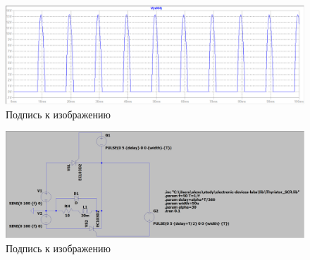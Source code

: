 \documentclass[a4paper, 12pt]{article}
\begin{document}
    \begin{figure}[H]
        \centering
        \includegraphics[scale=0.45]{a150_L20m.png}
        \captionsetup{skip=0pt}
        \caption{Подпись к изображению}
        \label{fig:a150_L20m}
    \end{figure}


    \begin{figure}[H]
        \centering
        \includegraphics[scale=0.22]{scheme3.png}
        \captionsetup{skip=0pt}
        \caption{Подпись к изображению}
        \label{fig:scheme3}
    \end{figure}
\end{document}
